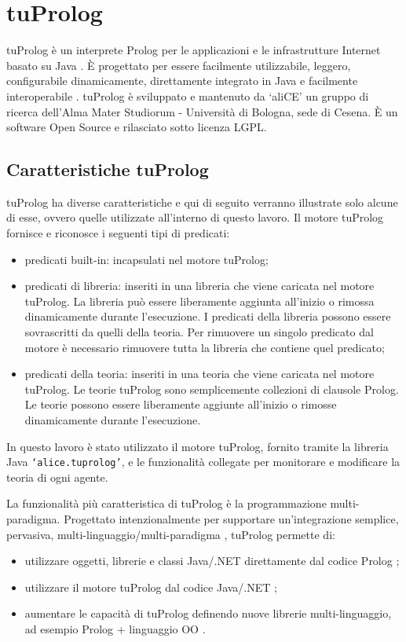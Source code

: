 \section{tuProlog}
tuProlog è un interprete Prolog per le applicazioni e le infrastrutture Internet basato su Java \cite{tuProlog}. È progettato per essere facilmente utilizzabile, leggero, configurabile dinamicamente, direttamente integrato in Java e facilmente interoperabile \cite{2p-alpnews2013}.
tuProlog è sviluppato e mantenuto da `aliCE' un gruppo di ricerca dell'Alma Mater Studiorum - Università di Bologna, sede di Cesena. È un software Open Source e rilasciato sotto licenza LGPL.

\subsection{Caratteristiche tuProlog}
tuProlog ha diverse caratteristiche e qui di seguito verranno illustrate solo alcune di esse, ovvero quelle utilizzate all'interno di questo lavoro.
Il motore tuProlog fornisce e riconosce i seguenti tipi di predicati:
\begin{itemize}
\item predicati built-in: incapsulati nel motore tuProlog;
\item predicati di libreria: inseriti in una libreria che viene caricata nel motore tuProlog. La libreria può essere liberamente aggiunta all'inizio o rimossa dinamicamente durante l'esecuzione. I predicati della libreria possono essere sovrascritti da quelli della teoria. Per rimuovere un singolo predicato dal motore è necessario rimuovere tutta la libreria che contiene quel predicato;
\item predicati della teoria: inseriti in una teoria che viene caricata nel motore tuProlog. Le teorie tuProlog sono semplicemente collezioni di clausole Prolog. Le teorie possono essere liberamente aggiunte all'inizio o rimosse dinamicamente durante l'esecuzione.
\end{itemize}

In questo lavoro è stato utilizzato il motore tuProlog, fornito tramite la libreria Java \texttt{`alice.tuprolog’}, e le funzionalità collegate per monitorare e modificare la teoria di ogni agente.

La funzionalità più caratteristica di tuProlog è la programmazione multi-paradigma.
Progettato intenzionalmente per supportare un'integrazione semplice, pervasiva, multi-linguaggio/multi-paradigma \cite{2p-alpnews2013}, tuProlog permette di:
\begin{itemize}
   \item utilizzare oggetti, librerie e classi Java/.NET direttamente dal codice Prolog \cite{2p-alpnews2013};
   \item utilizzare il motore tuProlog dal codice Java/.NET \cite{2p-alpnews2013};
   \item aumentare le capacità di tuProlog definendo nuove librerie multi-linguaggio, ad esempio Prolog + linguaggio OO \cite{2p-alpnews2013}.
\end{itemize}

